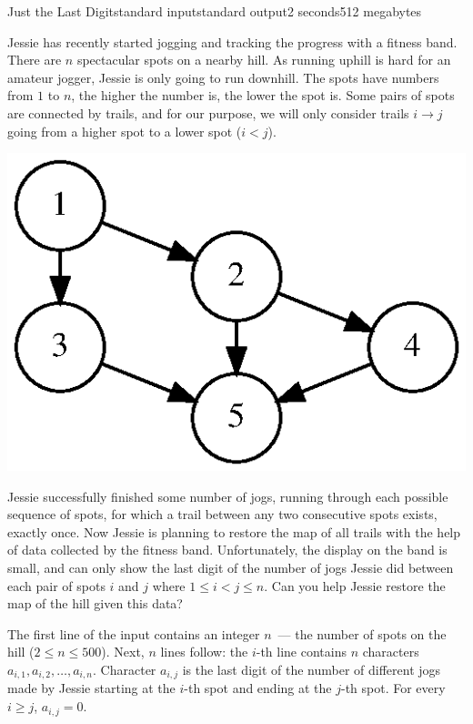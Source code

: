 \begin{problem}{Just the Last Digit}{standard input}{standard output}{2 seconds}{512 megabytes}

Jessie has recently started jogging and tracking the progress with a fitness band. There are $n$ spectacular spots on a nearby hill. As running uphill is hard for an amateur jogger, Jessie is only going to run downhill. The spots have numbers from $1$ to $n$, the higher the number is, the lower the spot is. Some pairs of spots are connected by trails, and for our purpose, we will only consider trails $i \to j$ going from a higher spot to a lower spot ($i < j$).

\begin{center}
\includegraphics[bb=0 0 188 130]{graph.eps}
\end{center}

Jessie successfully finished some number of jogs, running through each possible sequence of spots, for which a trail between any two consecutive spots exists, exactly once.
Now Jessie is planning to restore the map of all trails with the help of data collected by the fitness band. Unfortunately, the display on the band is small, and can only show the last digit of the number of jogs Jessie did between each pair of spots $i$ and $j$ where $1 \le i < j \le n$. Can you help Jessie restore the map of the hill given this data?

 

\InputFile
The first line of the input contains an integer $n$~--- the number of spots on the hill  ($2 \le n \le 500$).
Next, $n$ lines follow: the $i$-th line contains $n$ characters $a_{i,1}, a_{i,2}, \ldots, a_{i,n}$. Character $a_{i, j}$ is the last digit of the number of different jogs made by Jessie starting at the $i$-th spot and ending at the $j$-th spot. For every $i \ge j$, $a_{i, j} = 0$.


\end{problem}
